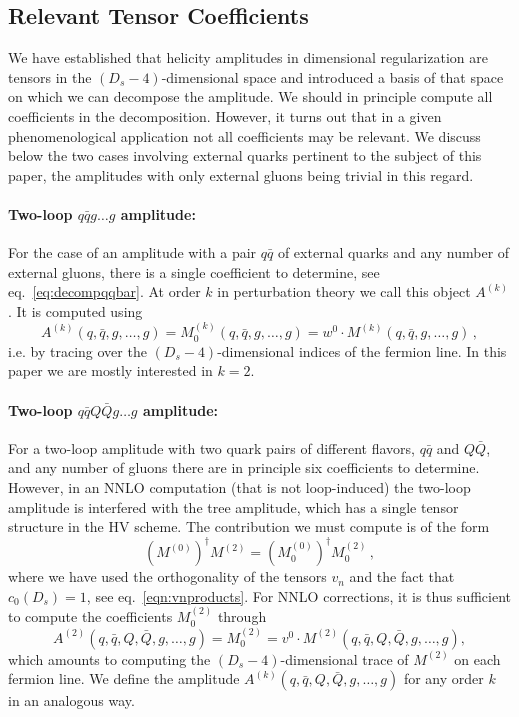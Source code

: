 \subsection{Relevant Tensor Coefficients}

We have established that helicity amplitudes in dimensional
regularization are tensors in the $(D_s-4)$-dimensional space and
introduced a basis of that space on which we can decompose the
amplitude.  We should in
principle compute all coefficients in the decomposition. However, it
turns out that in a given phenomenological application not all
coefficients may be relevant. We discuss below the two cases
involving external quarks pertinent to the subject of this 
paper, the amplitudes with only external gluons being trivial in
this regard.

\paragraph{Two-loop $q\bar qg\ldots g$ amplitude:}
For the case of an amplitude with a pair $q\bar q$ of external
quarks and any number of external gluons,
there is a single coefficient to determine, 
see eq.~\eqref{eq:decompqqbar}. At order $k$ in perturbation
theory we call this object $A^{(k)}$. It is
computed using
\begin{equation}\label{eq:qqProj}
    A^{(k)}(q,\bar q,g,\ldots,g)=M^{(k)}_0(q,\bar q,g,\ldots,g) =
	w^0\cdot M^{(k)}(q,\bar q,g,\ldots,g)\,,
\end{equation}
i.e. by
tracing over the $(D_s-4)$-dimensional indices of the
fermion line. In this paper we are mostly interested in $k=2$.

\paragraph{Two-loop $q\bar qQ\bar Qg\ldots g$ amplitude:}
For a
two-loop amplitude with two quark pairs of 
different flavors, $q\bar q$ and $Q\bar Q$, and any number of
gluons there are in principle six coefficients to determine. 
However, in an NNLO computation (that is not loop-induced) 
the two-loop amplitude is 
interfered with the tree amplitude, which has a single tensor
structure in the HV scheme. The contribution we must compute is of the form
\begin{equation}\label{eq:qqQQProj}
  \left(M^{(0)}\right)^\dagger M^{(2)}=
  \left(M^{(0)}_0\right)^\dagger M^{(2)}_0\,,
\end{equation}
where we have used the orthogonality of the tensors
$v_n$ and the fact that $c_0(D_s)=1$, see 
eq.~\eqref{eqn:vnproducts}. 
For NNLO corrections, it is
thus sufficient to compute the coefficients
$M^{(2)}_0$ through
\begin{equation}
  \label{eq:AmplitudeDefinition}
  A^{(2)}(q,\bar q,Q,\bar Q,g,\ldots,g)=
  M^{(2)}_0 = v^0 \cdot 
  M^{(2)}(q,\bar q,Q,\bar Q,g,\ldots,g),
\end{equation}
which amounts to computing the 
$(D_s-4)$-dimensional trace of $M^{(2)}$ on
each fermion line.  
We define the amplitude
$A^{(k)}(q,\bar q,Q,\bar Q,g,\ldots,g)$ for any order $k$
in an analogous way.

